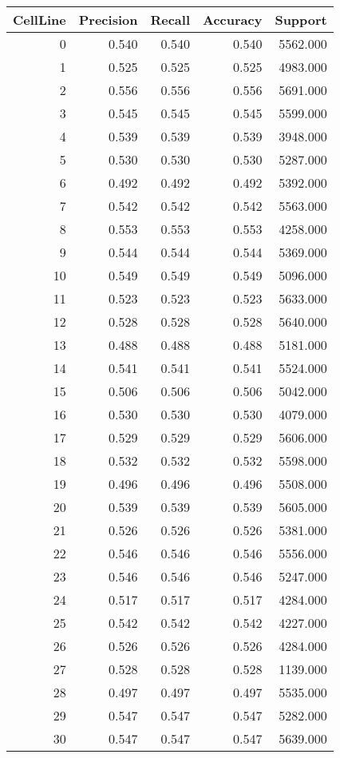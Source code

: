 \begin{tabular}{rrrrr}
\toprule
CellLine & Precision & Recall & Accuracy & Support \\
\midrule
0 & 0.540 & 0.540 & 0.540 & 5562.000 \\
1 & 0.525 & 0.525 & 0.525 & 4983.000 \\
2 & 0.556 & 0.556 & 0.556 & 5691.000 \\
3 & 0.545 & 0.545 & 0.545 & 5599.000 \\
4 & 0.539 & 0.539 & 0.539 & 3948.000 \\
5 & 0.530 & 0.530 & 0.530 & 5287.000 \\
6 & 0.492 & 0.492 & 0.492 & 5392.000 \\
7 & 0.542 & 0.542 & 0.542 & 5563.000 \\
8 & 0.553 & 0.553 & 0.553 & 4258.000 \\
9 & 0.544 & 0.544 & 0.544 & 5369.000 \\
10 & 0.549 & 0.549 & 0.549 & 5096.000 \\
11 & 0.523 & 0.523 & 0.523 & 5633.000 \\
12 & 0.528 & 0.528 & 0.528 & 5640.000 \\
13 & 0.488 & 0.488 & 0.488 & 5181.000 \\
14 & 0.541 & 0.541 & 0.541 & 5524.000 \\
15 & 0.506 & 0.506 & 0.506 & 5042.000 \\
16 & 0.530 & 0.530 & 0.530 & 4079.000 \\
17 & 0.529 & 0.529 & 0.529 & 5606.000 \\
18 & 0.532 & 0.532 & 0.532 & 5598.000 \\
19 & 0.496 & 0.496 & 0.496 & 5508.000 \\
20 & 0.539 & 0.539 & 0.539 & 5605.000 \\
21 & 0.526 & 0.526 & 0.526 & 5381.000 \\
22 & 0.546 & 0.546 & 0.546 & 5556.000 \\
23 & 0.546 & 0.546 & 0.546 & 5247.000 \\
24 & 0.517 & 0.517 & 0.517 & 4284.000 \\
25 & 0.542 & 0.542 & 0.542 & 4227.000 \\
26 & 0.526 & 0.526 & 0.526 & 4284.000 \\
27 & 0.528 & 0.528 & 0.528 & 1139.000 \\
28 & 0.497 & 0.497 & 0.497 & 5535.000 \\
29 & 0.547 & 0.547 & 0.547 & 5282.000 \\
30 & 0.547 & 0.547 & 0.547 & 5639.000 \\

\end{tabular}
